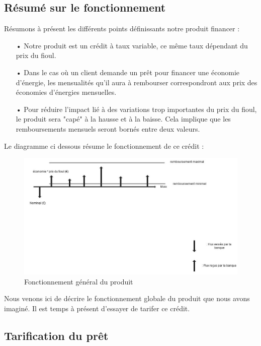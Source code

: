 \documentclass[10pt,a4paper]{article}
\begin{document}
\subsection{Résumé sur le fonctionnement}
Résumons à présent les différents points définissants notre produit financer :
\begin{itemize}
\item[•] Notre produit est un crédit à taux variable, ce même taux dépendant du prix du fioul.
\item[•] Dans le cas où un client demande un prêt pour financer une économie d'énergie, les mensualités qu'il aura à rembourser correspondront aux prix des économies d'énergies mensuelles.
\item[•] Pour réduire l'impact lié à des variations trop importantes du prix du fioul, le produit sera "capé" à la hausse et à la baisse. Cela implique que les remboursements mensuels seront bornés entre deux valeurs.
\end{itemize}
\vspace{3mm}
Le diagramme ci dessous résume le fonctionnement de ce crédit :
\vspace{10mm}
\begin{figure}[h!]
\begin{center}
\includegraphics[scale=0.5]{resume_credit.jpg}
\caption{Fonctionnement général du produit}
\end{center}
\end{figure}
\vspace{3mm}
Nous venons ici de décrire le fonctionnement globale du produit que nous avons imaginé. Il est temps à présent d'essayer de tarifer ce crédit.

\subsection{Tarification du prêt}
\end{document}
